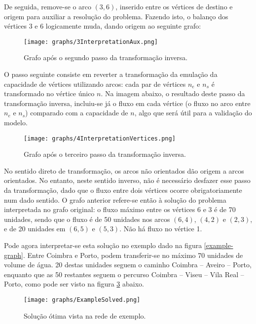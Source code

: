\documentclass[12pt, a4paper, titlepage]{article}
\begin{document}
De seguida, remove-se o arco $(3, 6)$, inserido entre os vértices de destino e origem para auxiliar
a resolução do problema. Fazendo isto, o balanço dos vértices 3 e 6 logicamente muda, dando origem
ao seguinte grafo:

\begin{figure}[H]
    \centering
    \texttt{[image: graphs/3InterpretationAux.png]}
    \caption{Grafo após o segundo passo da transformação inversa.}
    \label{3interpretation-graph}
\end{figure}

O passo seguinte consiste em reverter a transformação da emulação da capacidade de vértices
utilizando arcos: cada par de vértices $n_e$ e $n_s$ é transformado no vértice único $n$. Na imagem
abaixo, o resultado deste passo da transformação inversa, incluiu-se já o fluxo em cada vértice (o
fluxo no arco entre $n_e$ e $n_s$) comparado com a capacidade de $n$, algo que será útil para a
validação do modelo.

\begin{figure}[H]
    \centering
    \texttt{[image: graphs/4InterpretationVertices.png]}
    \caption{Grafo após o terceiro passo da transformação inversa.}
    \label{4interpretation-graph}
\end{figure}

No sentido direto de transformação, os arcos não orientados dão origem a arcos orientados. No
entanto, neste sentido inverso, não é necessário desfazer esse passo da transformação, dado que o
fluxo entre dois vértices ocorre obrigatoriamente num dado sentido. O grafo anterior refere-se então
à solução do problema interpretada no grafo original: o fluxo máximo entre os vértices 6 e 3 é de 70
unidades, sendo que o fluxo é de 50 unidades nos arcos $(6, 4)$, $(4, 2)$ e $(2, 3)$, e de 20
unidades em $(6, 5)$ e $(5, 3)$. Não há fluxo no vértice 1.

Pode agora interpretar-se esta solução no exemplo dado na figura \ref{example-graph}. Entre Coimbra
e Porto, podem transferir-se no máximo 70 unidades de volume de água. 20 destas unidades seguem o
caminho Coimbra -- Aveiro -- Porto, enquanto que as 50 restantes seguem o percurso Coimbra -- Viseu
-- Vila Real -- Porto, como pode ser visto na figura \ref{example-solved} abaixo.

\begin{figure}[H]
    \centering
    \texttt{[image: graphs/ExampleSolved.png]}
    \caption{Solução ótima vista na rede de exemplo.}
    \label{example-solved}
\end{figure}
\end{document}
